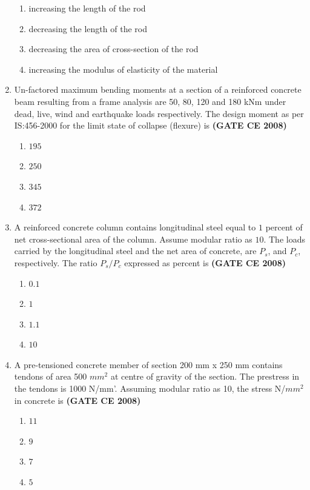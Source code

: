 \documentclass[journal]{IEEEtran}
\begin{document}
\begin{enumerate}
\begin{enumerate}
\item increasing the length of the rod 
\item decreasing the length of the rod
\item decreasing the area of cross-section of the rod
\item increasing the modulus of elasticity of the material
\end{enumerate}

\item Un-factored maximum bending moments at a section of a reinforced concrete beam resulting from
a frame analysis are 50, 80, 120 and 180 kNm under dead, live, wind and earthquake loads
respectively. The design moment  as per IS:456-2000 for the limit state of collapse (flexure)
is \textbf{(GATE CE 2008)}

\begin{enumerate}
\item $195$
\item $250$
\item $345$
\item $372$
\end{enumerate}

\item A reinforced concrete column contains longitudinal steel equal to $1$ percent of net cross-sectional area of the column. Assume modular ratio as $10$. The loads carried  by the longitudinal steel and the net area of concrete, are $P_s$, and $P_c$, respectively. The ratio $P_s/P_c$ expressed
as percent is \textbf{(GATE CE 2008)}

\begin{enumerate}
\item $0.1$
\item $1$
\item $1.1$
\item $10$
\end{enumerate}

\item A pre-tensioned concrete member of section 200 mm x 250 mm contains tendons of area 500 $mm^{2}$
at centre of gravity of the section. The prestress in the tendons is 1000 N/mm'. Assuming modular
ratio as 10, the stress N/$mm^{2}$ in concrete is \textbf{(GATE CE 2008)}

\begin{enumerate}
\item $11$
\item $9$
\item $7$
\item $5$
\end{enumerate}


\end{enumerate}
\end{document}
